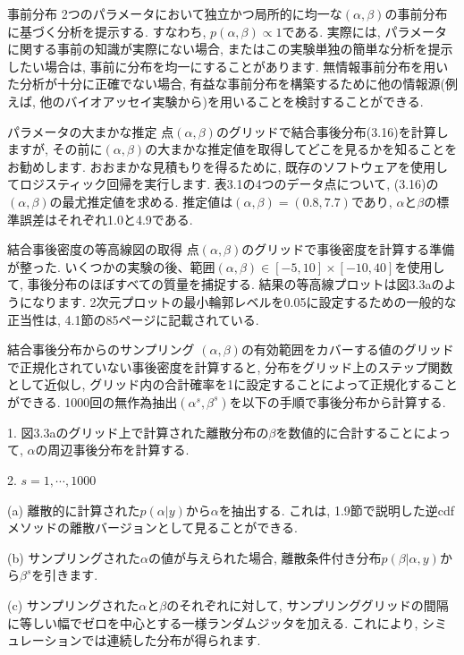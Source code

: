 \documentclass[10pt,dvipdfmx,a4]{beamer}
\begin{document}

\begin{frame}{事前分布}
2つのパラメータにおいて独立かつ局所的に均一な$(\alpha,\beta)$の事前分布に基づく分析を提示する.
すなわち, $p(\alpha,\beta)\propto1$である.
実際には, パラメータに関する事前の知識が実際にない場合, またはこの実験単独の簡単な分析を提示したい場合は, 事前に分布を均一にすることがあります.
無情報事前分布を用いた分析が十分に正確でない場合, 有益な事前分布を構築するために他の情報源(例えば, 他のバイオアッセイ実験から)を用いることを検討することができる.
\end{frame}


\begin{frame}{パラメータの大まかな推定}
点$(\alpha,\beta)$のグリッドで結合事後分布(3.16)を計算しますが, その前に$(\alpha,\beta)$の大まかな推定値を取得してどこを見るかを知ることをお勧めします.
おおまかな見積もりを得るために, 既存のソフトウェアを使用してロジスティック回帰を実行します.
表3.1の4つのデータ点について, (3.16)の$(\alpha,\beta)$の最尤推定値を求める.
推定値は$(\alpha,\beta)=(0.8,7.7)$であり, $\alpha$と$\beta$の標準誤差はそれぞれ1.0と4.9である.
\end{frame}


\begin{frame}{結合事後密度の等高線図の取得}
点$(\alpha,\beta)$のグリッドで事後密度を計算する準備が整った.
いくつかの実験の後、範囲$(\alpha,\beta)\in[-5,10]\times[-10,40]$を使用して, 事後分布のほぼすべての質量を捕捉する.
結果の等高線プロットは図3.3aのようになります.
2次元プロットの最小輪郭レベルを0.05に設定するための一般的な正当性は, 4.1節の85ページに記載されている.\end{frame}


\begin{frame}{結合事後分布からのサンプリング}
$(\alpha,\beta)$の有効範囲をカバーする値のグリッドで正規化されていない事後密度を計算すると, 分布をグリッド上のステップ関数として近似し, グリッド内の合計確率を1に設定することによって正規化することができる.
1000回の無作為抽出$(\alpha^s,\beta^s)$を以下の手順で事後分布から計算する.

1. 図3.3aのグリッド上で計算された離散分布の$\beta$を数値的に合計することによって, $\alpha$の周辺事後分布を計算する.

2. $s=1,\cdots,1000$

(a) 離散的に計算された$p(\alpha|y)$から$\alpha$を抽出する.
これは, 1.9節で説明した逆cdfメソッドの離散バージョンとして見ることができる.

(b) サンプリングされた$\alpha$の値が与えられた場合, 離散条件付き分布$p(\beta|\alpha,y)$から$\beta^s$を引きます.

(c) サンプリングされた$\alpha$と$\beta$のそれぞれに対して, サンプリンググリッドの間隔に等しい幅でゼロを中心とする一様ランダムジッタを加える.
これにより, シミュレーションでは連続した分布が得られます.
\end{frame}
\end{document}
